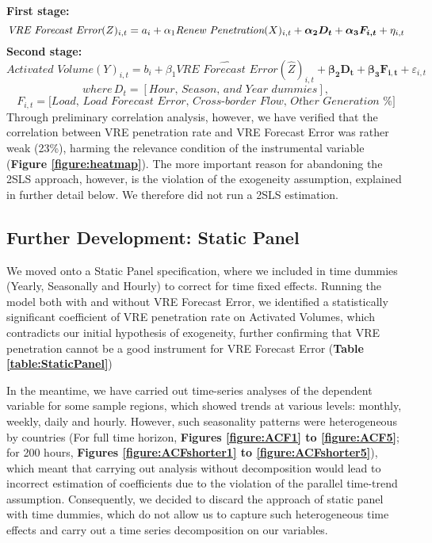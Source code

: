 \documentclass[12pt]{article}
\begin{document}
\small
\textbf{First stage:}
\vspace{-0.2in}
\[\textit{VRE Forecast Error}(Z)_{i, t} = a_{i} + \alpha_{1} \textit{Renew Penetration}(X)_{i, t} +\boldsymbol{\alpha_{2}D_{t}} + \boldsymbol{\alpha_{3}F_{i, t}} + \eta_{i, t}
\vspace{-0.3in}\]
\vspace{-0.3in}
\textbf{Second stage:}
\[\textit{Activated Volume}(Y)_{i, t} = b_{i} + \beta_{1}\widehat{\textit{VRE Forecast Error}}(\hat{Z})_{i, t} + \boldsymbol{\beta_{2}D_{t}} + \boldsymbol{\beta_{3}F_{i, t}} + \varepsilon_{i, t} \]
\vspace{-0.4in}
\[where \, D_{t} = [\textit{Hour, Season, and Year dummies}],\]
\vspace{-0.5in}
\[F_{i, t} = [\textit{Load, Load Forecast Error, Cross-border Flow, Other Generation \%]}\]
\normalsize
Through preliminary correlation analysis, however, we have verified that the correlation between VRE penetration rate and VRE Forecast Error was rather weak (23\%), harming the relevance condition of the instrumental variable (\textbf{Figure \ref{figure:heatmap}}). The more important reason for abandoning the 2SLS approach, however, is the violation of the exogeneity assumption, explained in further detail below. We therefore did not run a 2SLS estimation. \par

\subsection{Further Development: Static Panel} 
We moved onto a Static Panel specification, where we included in time dummies (Yearly, Seasonally and Hourly) to correct for time fixed effects. Running the model both with and without VRE Forecast Error, we identified a statistically significant coefficient of VRE penetration rate on Activated Volumes, which contradicts our initial hypothesis of exogeneity, further confirming that VRE penetration cannot be a good instrument for VRE Forecast Error (\textbf{Table \ref{table:StaticPanel}})\par

In the meantime, we have carried out time-series analyses of the dependent variable for some sample regions, which showed trends at various levels: monthly, weekly, daily and hourly. However, such seasonality patterns were heterogeneous by countries (For full time horizon, \textbf{Figures \ref{figure:ACF1} to \ref{figure:ACF5}}; for 200 hours, \textbf{Figures \ref{figure:ACFshorter1} to \ref{figure:ACFshorter5}}), which meant that carrying out analysis without decomposition would lead to incorrect estimation of coefficients due to the violation of the parallel time-trend assumption. Consequently, we decided to discard the approach of static panel with time dummies, which do not allow us to capture such heterogeneous time effects and carry out a time series decomposition on our variables.\par
\end{document}
